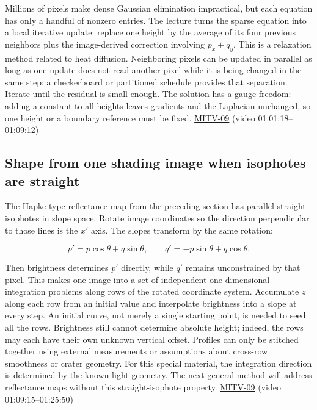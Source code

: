 Millions of pixels make dense Gaussian elimination impractical, but each equation has only a handful of nonzero entries. The lecture turns the sparse equation into a local iterative update: replace one height by the average of its four previous neighbors plus the image-derived correction involving \(p_x+q_y\). This is a relaxation method related to heat diffusion. Neighboring pixels can be updated in parallel as long as one update does not read another pixel while it is being changed in the same step; a checkerboard or partitioned schedule provides that separation. Iterate until the residual is small enough. The solution has a gauge freedom: adding a constant to all heights leaves gradients and the Laplacian unchanged, so one height or a boundary reference must be fixed. \hyperref[04-visual-computing-ii-ch036-mitv-09---shape-from-shading-general-case---from-first-order-nonlinear-pde-to-five-odes]{MITV-09} (video 01:01:18--01:09:12)

\subsection{Shape from one shading image when isophotes are straight}\label{04-visual-computing-ii-ch032-shape-from-one-shading-image-when-isophotes-are-straight}

The Hapke-type reflectance map from the preceding section has parallel straight isophotes in slope space. Rotate image coordinates so the direction perpendicular to those lines is the \(x'\) axis. The slopes transform by the same rotation:

\[
p'=p\cos\theta+q\sin\theta,\qquad q'=-p\sin\theta+q\cos\theta.
\]

Then brightness determines \(p'\) directly, while \(q'\) remains unconstrained by that pixel. This makes one image into a set of independent one-dimensional integration problems along rows of the rotated coordinate system. Accumulate \(z\) along each row from an initial value and interpolate brightness into a slope at every step. An initial curve, not merely a single starting point, is needed to seed all the rows. Brightness still cannot determine absolute height; indeed, the rows may each have their own unknown vertical offset. Profiles can only be stitched together using external measurements or assumptions about cross-row smoothness or crater geometry. For this special material, the integration direction is determined by the known light geometry. The next general method will address reflectance maps without this straight-isophote property. \hyperref[04-visual-computing-ii-ch036-mitv-09---shape-from-shading-general-case---from-first-order-nonlinear-pde-to-five-odes]{MITV-09} (video 01:09:15--01:25:50)

